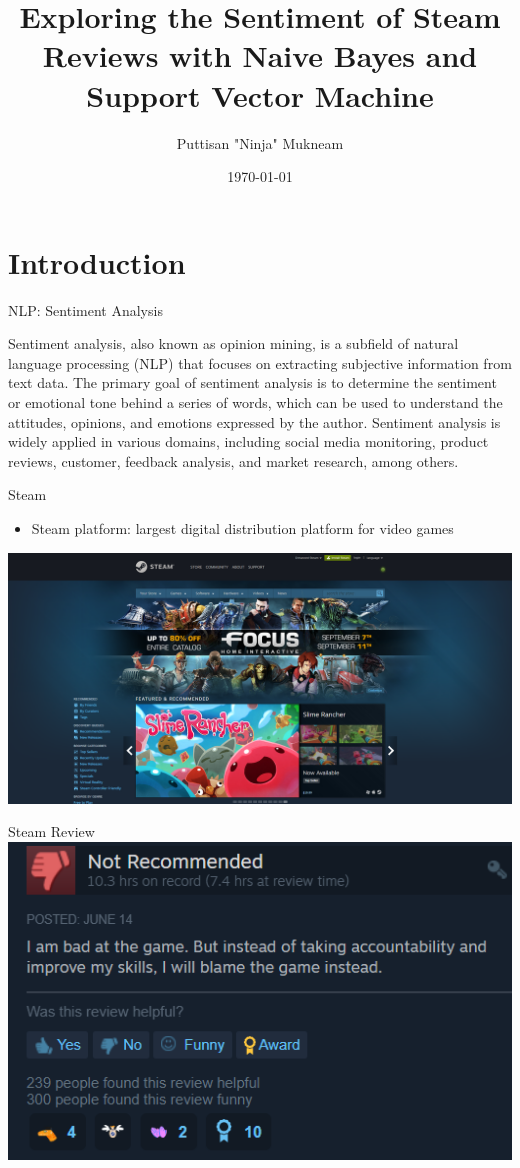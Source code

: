 \documentclass{beamer}
\title{Exploring the Sentiment of Steam Reviews with Naive Bayes and Support Vector Machine}
\author{Puttisan "Ninja" Mukneam}
\institute{Pitzer College}
\date{\today}
\begin{document}
\begin{frame}
\titlepage
\end{frame}

\section{Introduction}

\begin{frame}{NLP: Sentiment Analysis}

Sentiment analysis, also known as opinion mining, is a subfield of natural language processing (NLP) that focuses on extracting subjective information from text data. The primary goal of sentiment analysis is to determine the sentiment or emotional tone behind a series of words, which can be used to understand the attitudes, opinions, and emotions expressed by the author. Sentiment analysis is
widely applied in various domains, including social media monitoring, product reviews, customer, feedback analysis, and market research, among others.
    
\end{frame}

\begin{frame}{Steam}
\begin{itemize}
\item Steam platform: largest digital distribution platform for video games
\end{itemize}
\includegraphics[width = \textwidth]
{1.png}
\centering
\end{frame}

\begin{frame}{Steam Review}
\includegraphics[width = \textwidth]
{2.png}
\centering
\end{frame}
\end{document}
